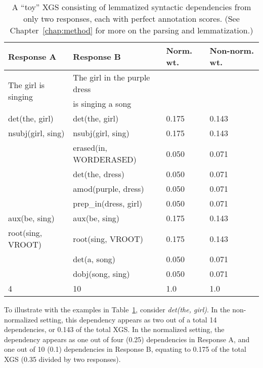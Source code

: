 \begin{table}[htb!]
\begin{center}
\begin{tabular}{|l|l|l|l|}
\hline
Response A & Response B & Norm. wt. & Non-norm. wt.\\
\hline
\multirow{2}{*}{The girl is singing} & The girl in the purple dress & & \\
& is singing a song & & \\
\hline
\hline
det(the, girl) & det(the, girl) & 0.175 & 0.143 \\
\hline
nsubj(girl, sing) & nsubj(girl, sing) & 0.175 & 0.143 \\
\hline
& erased(in, WORDERASED) & 0.050 & 0.071 \\
\hline
& det(the, dress) & 0.050 & 0.071 \\
\hline
& amod(purple, dress) & 0.050 & 0.071 \\
\hline
& prep\_in(dress, girl) & 0.050 & 0.071 \\
\hline
aux(be, sing) & aux(be, sing) & 0.175 & 0.143 \\
\hline
root(sing, VROOT) & root(sing, VROOT) & 0.175 & 0.143 \\
\hline
& det(a, song) & 0.050 & 0.071 \\
\hline
& dobj(song, sing) & 0.050 & 0.071 \\
\hline
\hline
4 & 10 & 1.0 & 1.0 \\
\hline
\end{tabular}
\caption{\label{tab:normalize-responses-deps} A ``toy'' XGS consisting of lemmatized syntactic dependencies from only two responses, each with perfect annotation scores. (See Chapter~\ref{chap:method} for more on the parsing and lemmatization.)}
\end{center}
\end{table}

To illustrate with the examples in Table~\ref{tab:normalize-responses-deps}, consider \textit{det(the, girl)}. In the non-normalized setting, this dependency appears as two out of a total 14 dependencies, or 0.143 of the total XGS. In the normalized setting, the dependency appears as one out of four (0.25) dependencies in Response A, and one out of 10 (0.1) dependencies in Response B, equating to 0.175 of the total XGS (0.35 divided by two responses).

